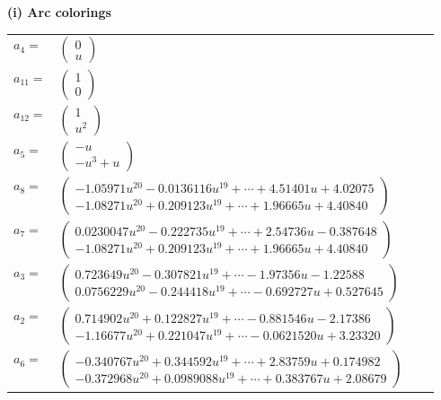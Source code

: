 \documentclass[1p]{elsarticle_modified}
\theoremstyle{definition}
\begin{document}
\flushleft \textbf{(i) Arc colorings}\\
\begin{tabular}{m{7pt} m{180pt} m{7pt} m{180pt} }
\flushright $a_{4}=$&$\begin{pmatrix}0\\u\end{pmatrix}$ \\
\flushright $a_{11}=$&$\begin{pmatrix}1\\0\end{pmatrix}$ \\
\flushright $a_{12}=$&$\begin{pmatrix}1\\u^2\end{pmatrix}$ \\
\flushright $a_{5}=$&$\begin{pmatrix}- u\\- u^3+u\end{pmatrix}$ \\
\flushright $a_{8}=$&$\begin{pmatrix}-1.05971 u^{20}-0.0136116 u^{19}+\cdots+4.51401 u+4.02075\\-1.08271 u^{20}+0.209123 u^{19}+\cdots+1.96665 u+4.40840\end{pmatrix}$ \\
\flushright $a_{7}=$&$\begin{pmatrix}0.0230047 u^{20}-0.222735 u^{19}+\cdots+2.54736 u-0.387648\\-1.08271 u^{20}+0.209123 u^{19}+\cdots+1.96665 u+4.40840\end{pmatrix}$ \\
\flushright $a_{3}=$&$\begin{pmatrix}0.723649 u^{20}-0.307821 u^{19}+\cdots-1.97356 u-1.22588\\0.0756229 u^{20}-0.244418 u^{19}+\cdots-0.692727 u+0.527645\end{pmatrix}$ \\
\flushright $a_{2}=$&$\begin{pmatrix}0.714902 u^{20}+0.122827 u^{19}+\cdots-0.881546 u-2.17386\\-1.16677 u^{20}+0.221047 u^{19}+\cdots-0.0621520 u+3.23320\end{pmatrix}$ \\
\flushright $a_{6}=$&$\begin{pmatrix}-0.340767 u^{20}+0.344592 u^{19}+\cdots+2.83759 u+0.174982\\-0.372968 u^{20}+0.0989088 u^{19}+\cdots+0.383767 u+2.08679\end{pmatrix}$ \\

\end{tabular}
\end{document}
